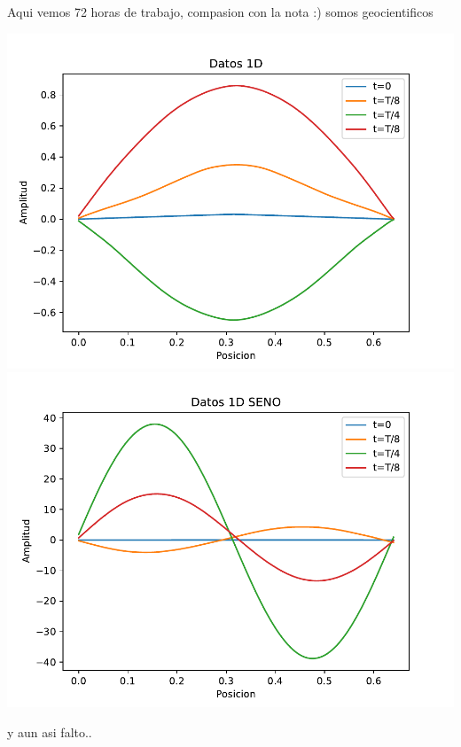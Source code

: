 \documentclass{article}
\begin{document}
Aqui vemos 72 horas de trabajo, compasion con la nota :) somos geocientificos
 
\includegraphics{Extremos Fijos 1D.pdf}
\centering
\includegraphics{Extremos Fijos 1D Sin.pdf}
\centering
 
y aun asi falto..
\end{document}

